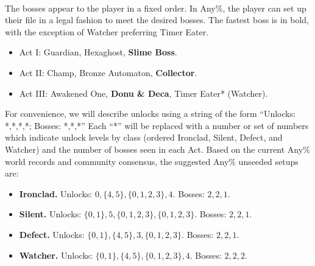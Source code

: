 \documentclass[12pt]{amsart}
\begin{document}
~\\
The bosses appear to the player in a fixed order.  
In Any\%, the player can set up their file in a legal fashion to meet the desired bosses.  
The fastest boss is in bold, with the exception of Watcher preferring Timer Eater.  
\begin{itemize}
    \item Act I: Guardian, Hexaghost, \textbf{Slime Boss}.  
    \item Act II: Champ, Bronze Automaton, \textbf{Collector}.  
    \item Act III: Awakened One, \textbf{Donu \& Deca}, Timer Eater* (Watcher).  
\end{itemize}

For convenience, we will describe unlocks using a string of the form ``Unlocks: *,*,*,*; Bosses: *,*,*''
Each ``*'' will be replaced with a number or set of numbers which indicate unlock levels by class (ordered Ironclad, Silent, Defect, and Watcher) and the number of bosses seen in each Act.  
Based on the current Any\% world records and community consensus, the suggested Any\% unseeded setups are: 
\begin{itemize}
    \item 
        \textbf{Ironclad.  }
        Unlocks: 
            $0, 
            \{4,5\}, 
            \{0,1,2,3\}, 
            4$. 
        Bosses: 
            $2, 
            2, 
            1$.  
    \item 
        \textbf{Silent.  }
        Unlocks: 
            $\{0, 1\}, 
            5, 
            \{0, 1, 2, 3\}, 
            \{0, 1, 2, 3\}$.  
        Bosses: 
            $2, 
            2, 
            1$.  
    \item 
        \textbf{Defect.  }
        Unlocks: 
            $\{0, 1\}, 
            \{4, 5\}, 
            3, 
            \{0, 1, 2, 3\}$.  
        Bosses: 
            $2, 
            2, 
            1$.  
    \item 
        \textbf{Watcher.  }
        Unlocks:
            $\{0, 1\}, 
            \{4, 5\}, 
            \{0, 1, 2, 3\}, 
            4$.  
        Bosses: 
            $2, 
            2, 
            2$.  
\end{itemize}
\end{document}
